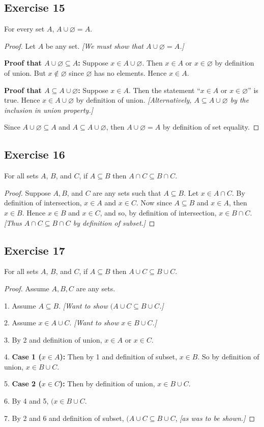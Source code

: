 \documentclass[14pt]{extarticle}
\newcommand{\es}{\varnothing}
\begin{document}
\subsection{Exercise 15}
For every set $A$, \(A \cup \es = A\).

\begin{proof}
Let $A$ be any set. {\it [We must show that \(A \cup \es = A\).]} 

{\bf Proof that \(A \cup \es \subseteq A\):} Suppose \(x \in A \cup \es\). Then \(x \in A\) or \(x \in \es\) by 
definition of union. But \(x \notin \es\) since $\es$ has no elements. Hence $x \in A$. 

{\bf Proof that \(A \subseteq A \cup \es\):} Suppose \(x \in A\). Then the statement “\(x \in A\) or \(x \in \es\)” 
is true. Hence \(x \in A \cup \es\) by definition of union. {\it [Alternatively, \(A \subseteq A \cup \es\) by the 
inclusion in union property.]}

Since \(A \cup \es \subseteq A\) and \(A \subseteq A \cup \es\), then \(A \cup \es = A\) by definition of set equality.
\end{proof}

\subsection{Exercise 16}
For all sets $A$, $B$, and $C$, if \(A \subseteq B\) then \(A \cap C \subseteq B \cap C\).

\begin{proof}
Suppose $A, B$, and $C$ are any sets such that \(A \subseteq B\). Let \(x \in A \cap C\). By definition of 
intersection, \(x \in A\) and \(x \in C\). Now since \(A \subseteq B\) and \(x \in A\), then \(x \in B\). Hence 
\(x \in B\) and \(x \in C\), and so, by definition of intersection, \(x \in B \cap C\). {\it [Thus 
\(A \cap C \subseteq B \cap C\) by definition of subset.]}
\end{proof}

\subsection{Exercise 17}
For all sets $A$, $B$, and $C$, if \(A \subseteq B\) then \(A \cup C \subseteq B \cup C\).

\begin{proof}
Assume $A,B,C$ are any sets.

1. Assume \(A \subseteq B\). {\it [Want to show \((A \cup C \subseteq B \cup C\).]}

2. Assume \(x \in A \cup C\). {\it [Want to show \(x \in B \cup C\).]}

3. By 2 and definition of union, $x \in A$ or $x \in C$.

4. {\bf Case 1 ($x \in A$):} Then by 1 and definition of subset, $x \in B$. So by definition of union, \(x \in B \cup C\).

5. {\bf Case 2 ($x \in C$):} Then by definition of union, \(x \in B \cup C\).

6. By 4 and 5, \((x \in B \cup C\).

7. By 2 and 6 and definition of subset, \((A \cup C \subseteq B \cup C\), {\it [as was to be shown.]}
\end{proof}
\end{document}
